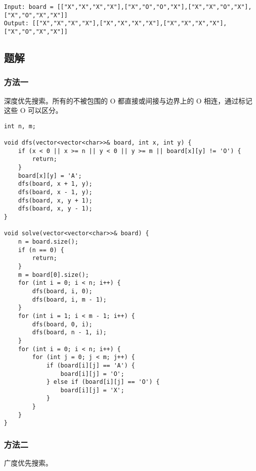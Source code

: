 \documentclass[lang=cn,10pt]{elegantbook}
\begin{document}
\begin{lstlisting}
Input: board = [["X","X","X","X"],["X","O","O","X"],["X","X","O","X"],["X","O","X","X"]]
Output: [["X","X","X","X"],["X","X","X","X"],["X","X","X","X"],["X","O","X","X"]]
\end{lstlisting}

\subsection*{题解}

\subsubsection*{方法一}

深度优先搜索。所有的不被包围的 O 都直接或间接与边界上的 O 相连，通过标记这些 O 可以区分。

\begin{lstlisting}
int n, m;

void dfs(vector<vector<char>>& board, int x, int y) {
	if (x < 0 || x >= n || y < 0 || y >= m || board[x][y] != 'O') {
		return;
	}
	board[x][y] = 'A';
	dfs(board, x + 1, y);
	dfs(board, x - 1, y);
	dfs(board, x, y + 1);
	dfs(board, x, y - 1);
}

void solve(vector<vector<char>>& board) {
	n = board.size();
	if (n == 0) {
		return;
	}
	m = board[0].size();
	for (int i = 0; i < n; i++) {
		dfs(board, i, 0);
		dfs(board, i, m - 1);
	}
	for (int i = 1; i < m - 1; i++) {
		dfs(board, 0, i);
		dfs(board, n - 1, i);
	}
	for (int i = 0; i < n; i++) {
		for (int j = 0; j < m; j++) {
			if (board[i][j] == 'A') {
				board[i][j] = 'O';
			} else if (board[i][j] == 'O') {
				board[i][j] = 'X';
			}
		}
	}
}
\end{lstlisting}

\subsubsection*{方法二}

广度优先搜索。
\end{document}
